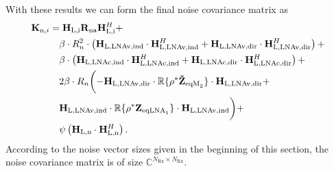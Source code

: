 With these results we can form the final noise covariance matrix as 
\begin{align}
\label{eq:noise_cov}\nonumber
\mat{K}_{\text{n},i}%
&=\mat{H}_\text{L,i} \mat{R}_\text{na} \mat{H}_\text{L,i}^H+\\\nonumber
&\quad	\beta \cdot R_n^2\cdot \left(\mat{H}_\text{L,LNAv,ind}\cdot\mat{H}_\text{L,LNAv,ind}^H+
	\mat{H}_\text{L,LNAv,dir}\cdot\mat{H}_\text{L,LNAv,dir}^H\right)+\\\nonumber
&\quad	\beta \cdot \left(\mat{H}_\text{L,LNAc,ind}\cdot\mat{H}_\text{L,LNAc,ind}^H+
	\mat{H}_\text{L,LNAc,dir}\cdot\mat{H}_\text{L,LNAc,dir}^H\right)+\\\nonumber
&\quad	2\beta \cdot R_n\biggl(
	-\mat{H}_\text{L,LNAv,dir} \cdot\mathbb{R}\{\rho^*\mat{\tilde{Z}}_{\text{eqM}_2}\}\cdot
	\mat{H}_\text{L,LNAv,dir}+\\\nonumber
&\quad	\mat{H}_\text{L,LNAv,ind} \cdot\mathbb{R}\{\rho^*\mat{Z}_{\text{eqLNA}_1}\}\cdot
	\mat{H}_\text{L,LNAv,ind}\biggr)+\\
&\quad	\psi\left(\mat{H}_\text{L,n}\cdot\mat{H}_\text{L,n}^H\right).
\end{align}
According to the noise vector sizes given in the beginning of this section, the noise covariance matrix is of size $\mathbb{C}^{N_\text{Rx}\times N_\text{Rx}}$.









